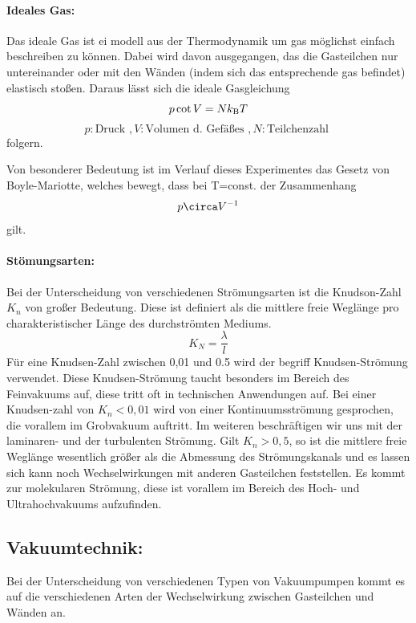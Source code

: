 \paragraph{Ideales Gas:}
Das ideale Gas ist ei modell aus der Thermodynamik um gas möglichst einfach beschreiben zu
können. Dabei wird davon ausgegangen, das die Gasteilchen nur untereinander oder mit den Wänden
(indem sich das entsprechende gas befindet) elastisch stoßen. Daraus lässt sich die ideale Gasgleichung
\begin{equation}
  p\cot V = Nk_\text{B}T \\
  \label{eqn:ideal}
\end{equation}
\begin{equation*}
  p:\text{Druck }, V:\text{Volumen d. Gefäßes }, N:\text{Teilchenzahl }
\end{equation*}
folgern.

Von besonderer Bedeutung ist im Verlauf dieses Experimentes das Gesetz von Boyle-Mariotte, welches bewegt,
dass bei T=const. der Zusammenhang
\begin{equation}
  p\circa V^{-1}
\end{equation}
gilt.

\paragraph{Stömungsarten:}
Bei der Unterscheidung von verschiedenen Strömungsarten ist die Knudson-Zahl $K_n$ von großer
Bedeutung. Diese ist definiert als die mittlere freie Weglänge pro charakteristischer Länge des
durchströmten Mediums.
\begin{equation}
  K_N = \frac{\lambda}{l}
  \label{eqn:Knudsen}
\end{equation}
Für eine Knudsen-Zahl zwischen 0,01 und 0.5 wird der begriff Knudsen-Strömung verwendet. Diese
Knudsen-Strömung taucht besonders im Bereich des Feinvakuums auf, diese tritt oft in technischen Anwendungen
auf.
Bei einer Knudsen-zahl von $K_n < 0,01$ wird von einer Kontinuumsströmung gesprochen, die vorallem im
Grobvakuum auftritt. Im weiteren beschräftigen wir uns mit der laminaren- und der turbulenten Strömung.
Gilt $K_n > 0,5$, so ist die mittlere freie Weglänge wesentlich größer als die Abmessung des Strömungskanals
und es lassen sich kann noch Wechselwirkungen mit anderen Gasteilchen feststellen. Es kommt zur molekularen
Strömung, diese ist vorallem im Bereich des Hoch- und Ultrahochvakuums aufzufinden.

\subsection{Vakuumtechnik:}
Bei der Unterscheidung von verschiedenen Typen von Vakuumpumpen kommt es auf die verschiedenen Arten der
Wechselwirkung zwischen Gasteilchen und Wänden an.

